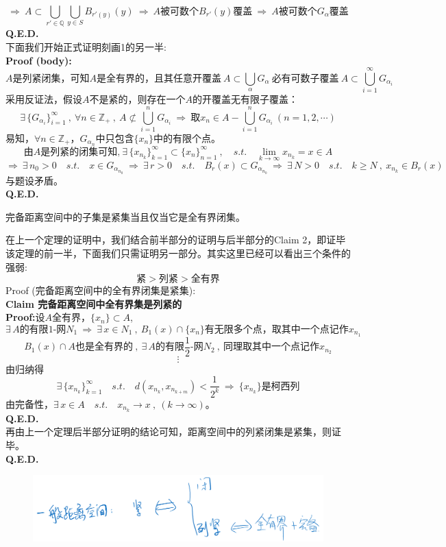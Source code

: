 \[\Rightarrow \ A \subset \bigcup_{r' \in \mathbb{Q}}\bigcup_{y \in S}B_{r'(y)}(y) \ \Rightarrow \ A\text{被可数个}B_{r'}(y)\text{覆盖} \ \Rightarrow \ A\text{被可数个}G_{\alpha}\text{覆盖}\]
\textbf{Q.E.D.}\\
下面我们开始正式证明刻画1的另一半:\\
\textbf{Proof (body):}
\[A\text{是列紧闭集，可知}A\text{是全有界的，且其任意开覆盖} \ A \subset \bigcup_{\alpha}G_{\alpha} \ \text{必有可数子覆盖} \ A \subset \bigcup_{i=1}^{\infty}G_{\alpha_i}\]
采用反证法，假设$A$不是紧的，则存在一个$A$的开覆盖无有限子覆盖：
\[\exists \, \{G_{\alpha_i}\}_{i=1}^{\infty} \ , \ \forall n \in \mathbb{Z}_+ \ , \ A \nsubset \bigcup_{i=1}^nG_{\alpha_i} \ \Rightarrow \ \text{取}x_n \in A-\bigcup_{i=1}^nG_{\alpha_i} \ (n=1,2,\cdots)\]
易知，$\forall n \in \mathbb{Z}_+$，$G_{\alpha_n}$中只包含$\{x_n\}$中的有限个点。\\
\[\text{由}A\text{是列紧的闭集可知,} \ \exists \, \{x_{n_k}\}_{k=1}^{\infty} \subset \{x_n\}_{n=1}^{\infty} \ , \quad s.t. \quad \lim_{k \to \infty}x_{n_k}=x \in A\]
\[\Rightarrow \ \exists \, n_0>0 \quad s.t. \quad x \in G_{\alpha_{n_0}} \ \Rightarrow \ \exists \, r>0 \quad s.t. \quad B_r(x) \subset G_{\alpha_{n_0}} \ \Rightarrow \ \exists \, N>0 \quad s.t. \quad k \geq N \ , \ x_{n_k} \in B_r(x)\]
与题设矛盾。\\
\textbf{Q.E.D.}
\begin{theorem}
    完备距离空间中的子集是紧集当且仅当它是全有界闭集。
\end{theorem}
在上一个定理的证明中，我们结合前半部分的证明与后半部分的Claim 2，即证毕该定理的前一半，下面我们只需证明另一部分。其实这里已经可以看出三个条件的强弱:
\[\text{紧}>\text{列紧}>\text{全有界}\]
Proof (完备距离空间中的全有界闭集是紧集):\\
\textbf{Claim 完备距离空间中全有界集是列紧的}\\
\textbf{Proof:}设$A$全有界，$\{x_n\} \subset A$,
\[\exists \, A\text{的有限}1\text{-网}N_1 \ \Rightarrow \ \exists \, x \in N_1 \ , \ B_1(x) \cap \{x_n\}\text{有无限多个点，取其中一个点记作}x_{n_1}\]
\[B_1(x) \cap A\text{也是全有界的} \ , \ \exists \, A\text{的有限}\frac{1}{2}\text{-网}N_2 \ , \ \text{同理取其中一个点记作}x_{n_2}\]
\[\vdots\]
由归纳得
\[\exists \, \{x_{n_k}\}_{k=1}^{\infty} \quad s.t. \quad d(x_{n_k},x_{n_{k+m}})<\frac{1}{2^k} \ \Rightarrow \ \{x_{n_k}\}\text{是柯西列}\]
由完备性，$\exists \, x \in A \quad s.t. \quad x_{n_k} \to x \ , \ (k \to \infty)$。\\
\textbf{Q.E.D.}\\
再由上一个定理后半部分证明的结论可知，距离空间中的列紧闭集是紧集，则证毕。\\
\textbf{Q.E.D.}
\begin{figure}[htbp]
    \center
    \includegraphics[scale=0.25]{./fig/2.2.3-1.png}
\end{figure}

